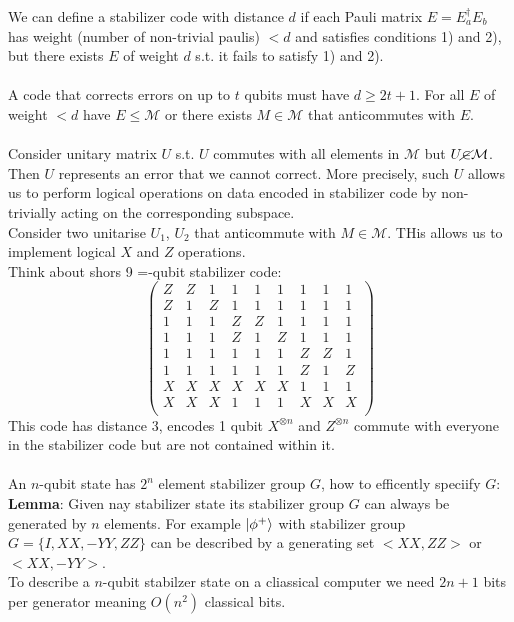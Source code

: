 \documentclass{article}
\begin{document}
We can define a stabilizer code with distance $d$ if each Pauli matrix $E = E_a^{\dagger} E_b$ has weight (number of non-trivial paulis) $< d$ and satisfies conditions 1) and 2), but there exists $E$ of weight $d$ s.t. it fails to satisfy 1) and 2).\\\\
A code that corrects errors on up to $t$ qubits must have $d \geq 2 t +1$. For all $E$ of weight $<d$ have $E \leq \mathcal{M}$ or there exists $M \in \mathcal{M}$ that anticommutes with $E$.\\\\
Consider unitary matrix $U$ s.t. $U$ commutes with all elements in $\mathcal{M}$ but $U \cancel \in \mathcal{M}$. Then $U$ represents an error that we cannot correct. More precisely, such $U$ allows us to perform logical operations on data encoded in stabilizer code by non-trivially acting on the corresponding subspace. \\
Consider two unitarise $U_1$, $U_2$ that anticommute with $M \in \mathcal{M}$. THis allows us to implement logical $X$ and $Z$ operations. \\
Think about shors 9 =-qubit stabilizer code:
$$
\begin{pmatrix}
        Z& Z & 1 & 1 & 1 & 1 &1 &1 &1\\
        Z& 1 & Z & 1 & 1 & 1 &1 &1 &1\\
        1& 1 & 1 & Z & Z & 1 &1 &1 &1\\
        1& 1 & 1 & Z & 1 & Z &1 &1 &1\\
        1& 1 & 1 & 1 & 1 & 1 &Z &Z &1\\
        1& 1 & 1 & 1 & 1 & 1 &Z &1 &Z\\
        X& X & X & X & X & X &1 &1 &1\\
        X& X & X & 1 & 1 & 1 &X &X &X\\
\end{pmatrix}
$$
This code has distance 3, encodes 1 qubit $X^{\otimes n}$ and $Z^{\otimes n}$ commute with everyone in the stabilizer code but are not contained within it.\\\\
An $n$-qubit state has $2^n$ element stabilizer group $G$, how to efficently speciify $G$:\\
\textbf{Lemma}: Given nay stabilizer state its stabilizer group $G$ can always be generated by $n$ elements.
For example $\ket{\phi^+}$ with stabilizer group $G = \{ I , XX, -YY, ZZ\}$ can be described by a generating set $< XX, ZZ>$ or $<XX, -YY>$. \\
To describe a $n$-qubit stabilzer state on a cliassical computer we need $2n+1$ bits per generator meaning $O(n^2)$ classical bits.
\end{document}
